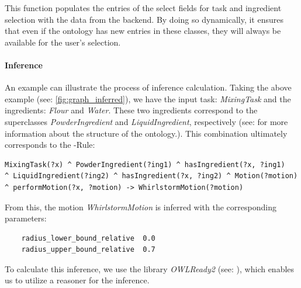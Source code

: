 This function populates the entries of the select fields for task and ingredient selection with the data from the backend. 
By doing so dynamically, it ensures that even if the ontology has new entries in these classes, they will always be available for the user's selection.

\paragraph{Inference}
\label{par:Inference}

An example can illustrate the process of inference calculation. Taking the above example (see: \ref{fig:graph_inferred}), we have the input task: \textit{MixingTask} and the ingredients: \textit{Flour} and \textit{Water}. 
These two ingredients correspond to the superclasses \textit{PowderIngredient} and \textit{LiquidIngredient}, respectively (see:  for more information 
about the structure of the ontology.). This combination ultimately corresponds to the -Rule:
\begin{lstlisting}
MixingTask(?x) ^ PowderIngredient(?ing1) ^ hasIngredient(?x, ?ing1)
^ LiquidIngredient(?ing2) ^ hasIngredient(?x, ?ing2) ^ Motion(?motion) 
^ performMotion(?x, ?motion) -> WhirlstormMotion(?motion)
\end{lstlisting}

From this, the motion \textit{WhirlstormMotion} is inferred with the corresponding parameters:
\begin{lstlisting}
    radius_lower_bound_relative  0.0
    radius_upper_bound_relative  0.7
\end{lstlisting}
To calculate this inference, we use the library \textit{OWLReady2} (see: ), which enables us to utilize a reasoner for the inference.

